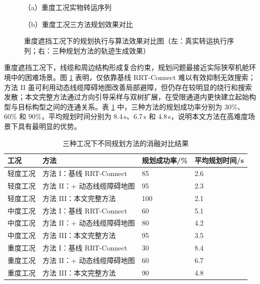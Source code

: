 \begin{figure}[htbp]
  \centering
  \begin{minipage}[t]{0.48\textwidth}
    \centering
    
    {\small （a）重度工况实物转运序列}
  \end{minipage}
  \hfill
  \begin{minipage}[t]{0.48\textwidth}
    \centering
    
    {\small （b）重度工况三方法规划效果对比}
  \end{minipage}
  \caption{重度遮挡工况下的规划执行与算法效果对比图（左：真实转运执行序列；右：三种规划方法的轨迹生成效果）}
  \label{fig:ch5:plan-heavy}
\end{figure}

\noindent
重度遮挡工况下，线缆和周边结构形成复合约束，规划问题最接近实际狭窄机舱环境中的困难场景。图 \ref{fig:ch5:plan-heavy} 表明，仅依靠基线 RRT-Connect 难以有效抑制无效搜索；方法 II 虽可利用动态线缆障碍地图改善局部避障，但仍存在较明显的绕行和搜索发散；本文完整方法通过方向引导采样与双树扩展，在受限通道内更快建立起始构型与目标构型之间的连通关系。表 \ref{tab:ch5:plan-ablation} 中，三种方法的规划成功率分别为 30\%、60\% 和 90\%，平均规划时间分别为 8.4\,s、6.7\,s 和 4.8\,s，说明本文方法在高难度场景下具有最明显的优势。

\begin{table}[htbp]
  \centering
  \small
  \caption{三种工况下不同规划方法的消融对比结果}
  \label{tab:ch5:plan-ablation}
  \begin{tabular}{|p{2.0cm}|p{4.0cm}|p{2.4cm}|p{2.4cm}|}
    \hline
    工况 & 方法 & 规划成功率/\% & 平均规划时间/s \\
    \hline
    轻度工况 & 方法 I：基线 RRT-Connect & 85 & 2.6 \\
    \hline
    轻度工况 & 方法 II：+ 动态线缆障碍地图 & 95 & 2.3 \\
    \hline
    轻度工况 & 方法 III：本文完整方法 & 100 & 2.1 \\
    \hline
    中度工况 & 方法 I：基线 RRT-Connect & 60 & 5.1 \\
    \hline
    中度工况 & 方法 II：+ 动态线缆障碍地图 & 80 & 4.2 \\
    \hline
    中度工况 & 方法 III：本文完整方法 & 95 & 3.5 \\
    \hline
    重度工况 & 方法 I：基线 RRT-Connect & 30 & 8.4 \\
    \hline
    重度工况 & 方法 II：+ 动态线缆障碍地图 & 60 & 6.7 \\
    \hline
    重度工况 & 方法 III：本文完整方法 & 90 & 4.8 \\
    \hline
  \end{tabular}
\end{table}

